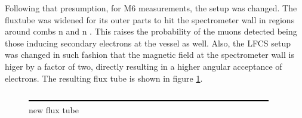   
  Following that presumption, for M6 measurements, the setup was changed. The fluxtube was widened for its outer parts to hit the spectrometer wall in regions around combs n and n . This raises the probability of the muons detected being those inducing secondary electrons at the vessel as well. Also, the LFCS setup was changed in such fashion that the magnetic field at the spectrometer wall is higer by a factor of two, directly resulting in a higher angular acceptance of electrons. The resulting flux tube is shown in figure \ref{fig:newFluxTube}. 
  \begin{figure}
	\label{fig:newFluxTube}
	\caption{new flux tube}
  	\includegraphics[width = 0.9 \textwidth]{graphics/dummy.eps}
  \end{figure}
  
  
